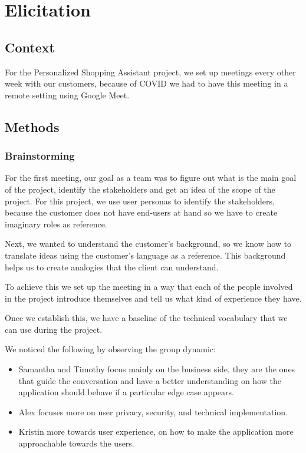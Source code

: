 \section{Elicitation}
\subsection{Context}
For the Personalized Shopping Assistant project, we set up meetings every other 
week with our customers, because of COVID we had to have this meeting in a 
remote setting using Google Meet.

\subsection{Methods}
\subsubsection{Brainstorming}
For the first meeting, our goal as a team was to figure out what is the main 
goal of the project, identify the stakeholders and get an idea of the scope of 
the project. For this project, we use user personas \cite{user_personas} to 
identify the stakeholders, because the customer does not have end-users at 
hand so we have to create imaginary roles as reference. \newline

\noindent Next, we wanted to understand the customer's background, so we know 
how to translate ideas using the customer's language as a reference. This 
background helps us to create analogies that the client can 
understand. \newline

\noindent To achieve this we set up the meeting in a way that each of the 
people involved in the project introduce themselves and tell us what kind of 
experience they have. \newline

\noindent Once we establish this, we have a baseline of the technical 
vocabulary that we can use during the project. \newline

\noindent We noticed the following by observing the group dynamic:
\begin{itemize}
    \item Samantha and Timothy focus mainly on the business side, they are 
    the ones that guide the conversation and have a better understanding 
    on how the application should behave if a particular edge case appears.
    \item Alex focuses more on user privacy, security, and technical 
    implementation.
    \item Kristin more towards user experience, on how to make the application 
    more approachable towards the users.
\end{itemize}

